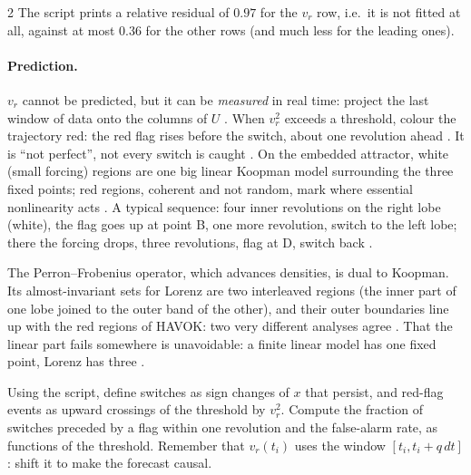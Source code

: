 \begin{paracol}{2}
The script prints a relative residual of $0.97$ for the $v_r$ row, i.e.\ it is not fitted at all, against at most $0.36$ for the
other rows (and much less for the leading ones).

\paragraph{Prediction.} $v_r$ cannot be predicted, but it can be \emph{measured} in real time: project the last window of data
onto the columns of $U$ . When $v_r^2$ exceeds a threshold, colour the trajectory red: the red flag
rises before the switch, about one revolution ahead . It is ``not
perfect'', not every switch is caught . On the embedded attractor, white (small forcing) regions are one big
linear Koopman model surrounding the three fixed points; red regions, coherent and not random, mark where essential nonlinearity
acts . A typical sequence: four inner revolutions on the right lobe
(white), the flag goes up at point B, one more revolution, switch to the left lobe; there the forcing drops, three revolutions,
flag at D, switch back .

\begin{remark}
The Perron--Frobenius operator, which advances densities, is dual to Koopman. Its almost-invariant sets for Lorenz are two
interleaved regions (the inner part of one lobe joined to the outer band of the other), and their outer boundaries line up with
the red regions of HAVOK: two very different analyses agree . That the linear part
fails somewhere is unavoidable: a finite linear model has one fixed point, Lorenz has three .
\end{remark}

\begin{exercise}
Using the script, define switches as sign changes of $x$ that persist, and red-flag events as upward crossings of the threshold by
$v_r^2$. Compute the fraction of switches preceded by a flag within one revolution and the false-alarm rate, as functions of the
threshold. Remember that $v_r(t_i)$ uses the window $[t_i,t_i+q\,dt]$: shift it to make the forecast causal.
\end{exercise}


\end{paracol}
